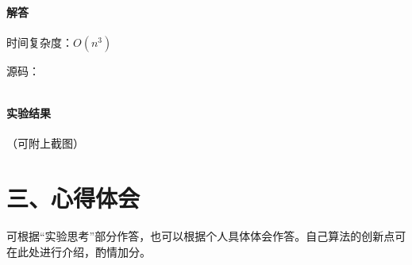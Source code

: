 \documentclass[12pt,a4paper]{ctexart}
\begin{document}
\vspace{5pt}

\paragraph{解答} 时间复杂度：$O(n^3)$

源码：
\inputminted[bgcolor=codebg,frame=lines,autogobble,linenos=true,breaklines]{cpp}{src/t3.cpp}

\vspace{5pt}

\paragraph{实验结果}
（可附上截图）

\newpage

\section*{三、心得体会}
    可根据“实验思考”部分作答，也可以根据个人具体体会作答。自己算法的创新点可在此处进行介绍，酌情加分。
\end{document}

